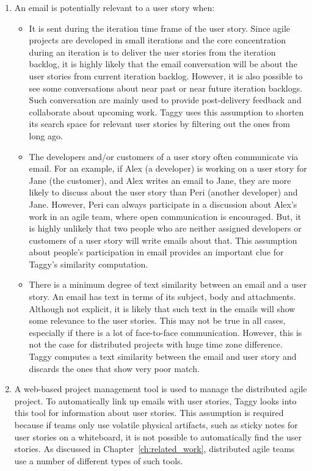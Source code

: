 \begin{enumerate}
	\item An email is potentially relevant to a user story when:
		\begin{itemize}
			\item It is sent during the iteration time frame of the user story. Since agile projects are developed in small iterations and the core concentration during an iteration is to deliver the user stories from the iteration backlog, it is highly likely that the email conversation will be about the user stories from current iteration backlog. However, it is also possible to see some conversations about near past or near future iteration backlogs. Such conversation are mainly used to provide post-delivery feedback and collaborate about upcoming work. Taggy uses this assumption to shorten its search space for relevant user stories by filtering out the ones from long ago.
			
			\item The developers and/or customers of a user story often communicate via email. For an example, if Alex (a developer) is working on a user story for Jane (the customer), and Alex writes an email to Jane, they are more likely to discuss about the user story than Peri (another developer) and Jane. However, Peri can always participate in a discussion about Alex's work in an agile team, where open communication is encouraged. But, it is highly unlikely that two people who are neither assigned developers or customers of a user story will write emails about that. This assumption about people's participation in email provides an important clue for Taggy's similarity computation.
			
			\item There is a minimum degree of text similarity between an email and a user story. An email has text in terms of its subject, body and attachments. Although not explicit, it is likely that such text in the emails will show some relevance to the user stories. This may not be true in all cases, especially if there is a lot of face-to-face communication. However, this is not the case for distributed projects with huge time zone difference. Taggy computes a text similarity between the email and user story and discards the ones that show very poor match.
		\end{itemize}
	 \item A web-based project management tool is used to manage the distributed agile project. To automatically link up emails with user stories, Taggy looks into this tool for information about user stories. This assumption is required because if teams only use volatile physical artifacts, such as sticky notes for user stories on a whiteboard, it is not possible to automatically find the user stories. As discussed in Chapter~\ref{ch:related_work}, distributed agile teams use a number of different types of such tools.
	

\end{enumerate}

